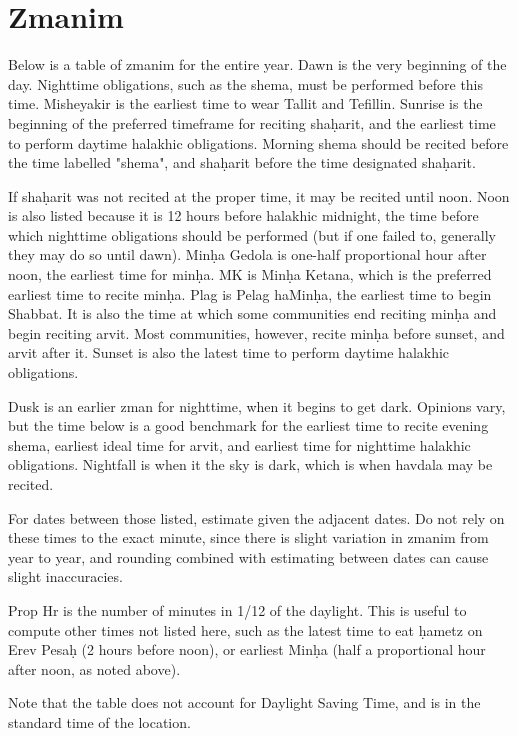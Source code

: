 \chapter{Zmanim}

Below is a table of zmanim for the entire year. Dawn is the very beginning of the day. Nighttime obligations, such as the shema, must be performed before this time. Misheyakir is the earliest time to wear Tallit and Tefillin.  Sunrise is the beginning of the preferred timeframe for reciting sha\d{h}arit, and the earliest time to perform daytime halakhic obligations. Morning shema should be recited before the time labelled "shema", and sha\d{h}arit before the time designated sha\d{h}arit.

If sha\d{h}arit was not recited at the proper time, it may be recited until noon. Noon is also listed because it is 12 hours before halakhic midnight, the time before which nighttime obligations should be performed (but if one failed to, generally they may do so until dawn). Min\d{h}a Gedola is one-half proportional hour after noon, the earliest time for min\d{h}a. MK is Min\d{h}a Ketana, which is the preferred earliest time to recite min\d{h}a. Plag is Pelag haMin\d{h}a, the earliest time to begin Shabbat. It is also the time at which some communities end reciting min\d{h}a and begin reciting arvit. Most communities, however, recite min\d{h}a before sunset, and arvit after it. Sunset is also the latest time to perform daytime halakhic obligations.

Dusk is an earlier zman for nighttime, when it begins to get dark. Opinions vary, but the time below is a good benchmark for the earliest time to recite evening shema, earliest ideal time for arvit, and earliest time for nighttime halakhic obligations. Nightfall is when it the sky is dark, which is when havdala may be recited.

For dates between those listed, estimate given the adjacent dates. Do not rely on these times to the exact minute, since there is slight variation in zmanim from year to year, and rounding combined with estimating between dates can cause slight inaccuracies.

Prop Hr is the number of minutes in 1/12 of the daylight. This is useful to compute other times not listed here, such as the latest time to eat \d{h}ametz on Erev Pesa\d{h} (2 hours before noon), or earliest Min\d{h}a (half a proportional hour after noon, as noted above).

Note that the table does not account for Daylight Saving Time, and is in the standard time of the location.

